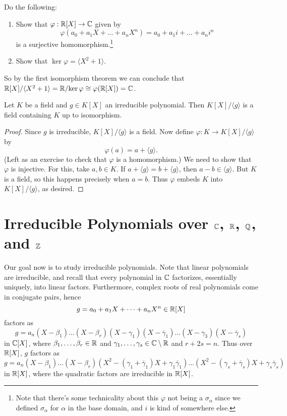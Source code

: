 \begin{exercise}
  Do the following:
  \begin{enumerate}
    \item Show that $\varphi : \mathbb{R}[X] \to \mathbb{C}$ given by
      \[
        \varphi (a_0 + a_1 X + \dots + a_n X^n) = a_0 + a_1 i + \dots + a_n i^n
      \]
      is a surjective homomorphism.\footnote{Note that there's some technicality about this $\varphi$ not being a $\sigma_{\alpha}$ since we defined $\sigma_{\alpha}$ for $\alpha$ in the base domain, and $i$ is kind of somewhere else.}
    \item Show that $\ker \varphi = \langle X^2 + 1 \rangle$.
  \end{enumerate}
  So by the first isomorphism theorem we can conclude
  that $\mathbb{R}[X] / \langle X^2 + 1 \rangle = \mathbb{R} / {\ker \varphi} \cong \varphi(\mathbb{R}[X]) = \mathbb{C}$.
\end{exercise}

\begin{theorem}
  Let $K$ be a field and $g \in K[X]$ an irreducible
  polynomial. Then $K[X] / \langle g \rangle$ is a field
  containing $K$ up to isomorphism.
\end{theorem}

\begin{proof}
  Since $g$ is irreducible, $K[X] / \langle g \rangle$
  is a field. Now define $\varphi : K \to K[X] / \langle g \rangle$ by
  \[
    \varphi (a) = a + \langle g \rangle.
  \]
  (Left as an exercise to check that $\varphi$ is a
  homomorphism.) We need to show that $\varphi$ is
  injective. For this, take $a, b \in K$. If
  $a + \langle g \rangle = b + \langle g \rangle$,
  then $a - b \in \langle g \rangle$. But $K$ is a field,
  so this happens precisely when $a = b$. Thus
  $\varphi$ embeds $K$ into $K[X] / \langle g \rangle$,
  as desired.
\end{proof}

\section{\texorpdfstring{Irreducible Polynomials over $\mathbb{C}$, $\mathbb{R}$, $\mathbb{Q}$, and $\mathbb{Z}$}{Irreducible Polynomials over C, R, Q, and Z}}
Our goal now is to study irreducible polynomials. Note
that linear polynomials are irreducible, and recall that
every polynomial in $\mathbb{C}$ factorizes, essentially
uniquely, into linear factors. Furthermore, complex roots
of real polynomials come in conjugate pairs, hence
\[
  g = a_0 + a_1 X + \dots + a_n X^n \in \mathbb{R}[X]
\]
factors as
\[g = a_n (X - \beta_1) \dots (X - \beta_r) (X - \gamma_1)(X - \overline{\gamma}_1) \dots (X - \gamma_3) (X - \overline{\gamma}_s)\]
in $\mathbb{C}[X]$, where $\beta_1, \dots, \beta_r \in \mathbb{R}$ and $\gamma_1, \dots, \gamma_s \in \mathbb{C} \setminus \mathbb{R}$ and
$r + 2s = n$. Thus over $\mathbb{R}[X]$, $g$ factors as
\[
  g = a_n (X - \beta_1) \dots (X - \beta_r) (X^2 - (\gamma_1 + \overline{\gamma}_1) X + \gamma_1 \overline{\gamma}_1) \dots (X^2 - (\gamma_s + \overline{\gamma}_s) X + \gamma_s \overline{\gamma}_s)
\]
in $\mathbb{R}[X]$, where the quadratic factors are irreducible
in $\mathbb{R}[X]$.

